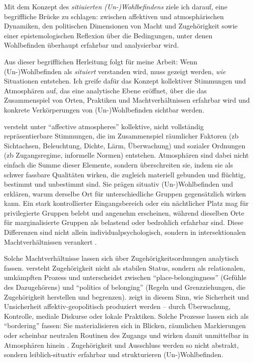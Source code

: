 Mit dem Konzept des \emph{sitiuierten (Un\nobreakdash-)Wohl\-be\-find\-ens} ziele ich darauf, eine begriffliche Brücke zu schlagen: zwischen affektiven und atmosphärischen Dynamiken, den politischen Dimensionen von Macht und Zugehörigkeit sowie einer epistemologischen Reflexion über die Bedingungen, unter denen Wohlbefinden überhaupt erfahrbar und analysierbar wird.

\vspace{1em}

Aus dieser begrifflichen Herleitung folgt für meine Arbeit: Wenn (Un\nobreakdash-)Wohl\-be\-find\-en als \emph{situiert} verstanden wird, muss gezeigt werden, \emph{wie} Situationen entstehen. Ich greife dafür das Konzept kollektiver Stimmungen und Atmosphären auf, das eine analytische Ebene eröffnet, über die das Zusammenspiel von Orten, Praktiken und Machtverhältnissen erfahrbar wird und konkrete Verkörperungen von (Un\nobreakdash-)Wohl\-be\-find\-en sichtbar werden.

\textcite{andersonAffectiveAtmospheres2009} versteht unter \enquote{affective atmospheres} kollektive, nicht vollständig repräsentierbare Stimmungen, die im Zusammenspiel räumlicher Faktoren (\gls{zb} Sichtachsen, Beleuchtung, Dichte, Lärm, Überwachung) und sozialer Ordnungen (\gls{zb} Zugangsregime, informelle Normen) entstehen. Atmosphären sind dabei nicht einfach die Summe dieser Elemente, sondern überschreiten sie, indem sie als schwer fassbare Qualitäten wirken, die zugleich materiell gebunden und flüchtig, bestimmt und unbestimmt sind. Sie prägen situativ (Un\nobreakdash-)Wohl\-be\-find\-en und erklären, warum derselbe Ort für unterschiedliche Gruppen gegensätzlich wirken kann. Ein stark kontrollierter Eingangsbereich oder ein nächtlicher Platz mag für privilegierte Gruppen belebt und angenehm erscheinen, während dieselben Orte für marginalisierte Gruppen als belastend oder bedrohlich erfahrbar sind. Diese Differenzen sind nicht allein individualpsychologisch, sondern in intersektionalen Machtverhältnissen verankert \parencite{andersonAffectiveAtmospheres2009}.

Solche Machtverhältnisse lassen sich über Zugehörigkeitsordnungen analytisch fassen. \textcite{antonsichSearchingBelongingAnalytical2010} versteht Zugehörigkeit nicht als stabilen Status, sondern als relationalen, umkämpften Prozess und unterscheidet zwischen \enquote{place-belongingness} (Gefühle des Dazugehörens) und \enquote{politics of belonging} (Regeln und Grenzziehungen, die Zugehörigkeit herstellen und begrenzen). \textcite{painGlobalizedFearEmotional2009} zeigt in diesem Sinn, wie Sicherheit und Unsicherheit affektiv-geopolitisch produziert werden -- durch Überwachung, Kontrolle, mediale Diskurse oder lokale Praktiken. Solche Prozesse lassen sich als \enquote{bordering} fassen: Sie materialisieren sich in Blicken, räumlichen Markierungen oder scheinbar neutralen Routinen des Zugangs und wirken damit unmittelbar in Atmosphären hinein \parencite{yuval-davisBelongingPoliticsBelonging2006}. Zugehörigkeit und Ausschluss werden so nicht abstrakt, sondern leiblich-situativ erfahrbar und strukturieren (Un\nobreakdash-)Wohl\-be\-find\-en.

